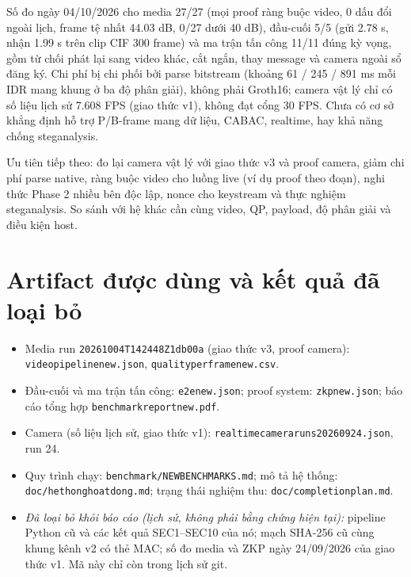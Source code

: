 \documentclass[11pt,a4paper]{article}
\renewcommand{\_}{\origunderscore\allowbreak}
\begin{document}
Số đo ngày 04/10/2026 cho media 27/27 (mọi proof ràng buộc video, 0 dấu đổi ngoài lịch, frame tệ nhất 44.03 dB, 0/27 dưới 40 dB), đầu-cuối 5/5 (gửi 2.78 s, nhận 1.99 s trên clip CIF 300 frame) và ma trận tấn công 11/11 đúng kỳ vọng, gồm từ chối phát lại sang video khác, cắt ngắn, thay message và camera ngoài sổ đăng ký. Chi phí bị chi phối bởi parse bitstream (khoảng 61 / 245 / 891 ms mỗi IDR mang khung ở ba độ phân giải), không phải Groth16; camera vật lý chỉ có số liệu lịch sử 7.608 FPS (giao thức v1), không đạt cổng 30 FPS. Chưa có cơ sở khẳng định hỗ trợ P/B-frame mang dữ liệu, CABAC, realtime, hay khả năng chống steganalysis.

Ưu tiên tiếp theo: đo lại camera vật lý với giao thức v3 và proof camera, giảm chi phí parse native, ràng buộc video cho luồng live (ví dụ proof theo đoạn), nghi thức Phase 2 nhiều bên độc lập, nonce cho keystream và thực nghiệm steganalysis. So sánh với hệ khác cần cùng video, QP, payload, độ phân giải và điều kiện host.

\section*{Artifact được dùng và kết quả đã loại bỏ}
\begin{itemize}
\item Media run \texttt{20261004T142448Z\_1db00a} (giao thức v3, proof camera): \texttt{video\_pipeline\_new.json}, \texttt{quality\_per\_frame\_new.csv}.
\item Đầu-cuối và ma trận tấn công: \texttt{e2e\_new.json}; proof system: \texttt{zkp\_new.json}; báo cáo tổng hợp \texttt{benchmark\_report\_new.pdf}.
\item Camera (số liệu lịch sử, giao thức v1): \texttt{realtime\_camera\_runs\_20260924.json}, run 24.
\item Quy trình chạy: \texttt{benchmark/NEW\_BENCHMARKS.md}; mô tả hệ thống: \texttt{doc/he\_thong\_hoat\_dong.md}; trạng thái nghiệm thu: \texttt{doc/completion\_plan.md}.
\item \emph{Đã loại bỏ khỏi báo cáo (lịch sử, không phải bằng chứng hiện tại):} pipeline Python cũ và các kết quả SEC1--SEC10 của nó; mạch SHA-256 cũ cùng khung kênh v2 có thẻ MAC; số đo media và ZKP ngày 24/09/2026 của giao thức v1. Mã này chỉ còn trong lịch sử git.
\end{itemize}
\end{document}
